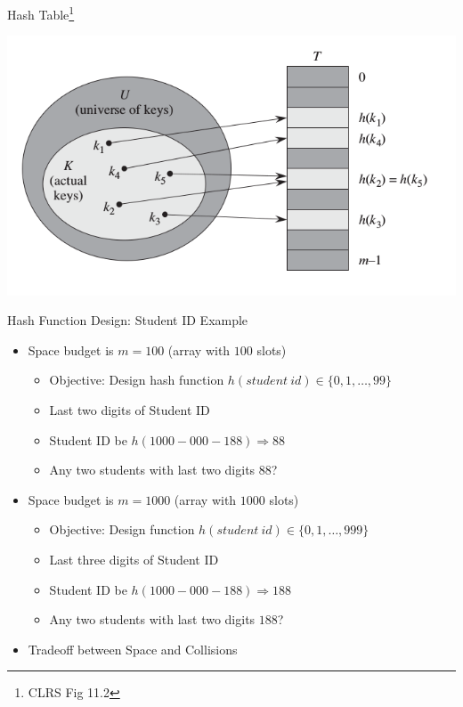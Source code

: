 \documentclass{beamer}
\begin{document}
\begin{frame}{Hash Table\footnote{CLRS Fig 11.2}}
    \begin{center}
        \includegraphics[scale=0.5]{hashTableAbstract.png}
    \end{center}
\end{frame}

\begin{frame}{Hash Function Design: Student ID Example}
    \begin{itemize}
        \item Space budget is $m=100$ (array with $100$ slots) 
        \begin{itemize}
            \item Objective: Design hash function $h(student\ id) \in \{0, 1, \ldots, 99\}$ \pause
            \item Last two digits of Student ID
            \item Student ID be $h(1000-000-188) \Rightarrow 88$ 
            \item Any two students with last two digits $88$?
        \end{itemize} 
        \item Space budget is $m=1000$ (array with $1000$ slots) \pause
        \begin{itemize}
            \item Objective: Design function $h(student\ id) \in \{0, 1, \ldots, 999\}$ \pause
            \item Last three digits of Student ID
            \item Student ID be $h(1000-000-188) \Rightarrow 188$ 
            \item Any two students with last two digits $188$?
        \end{itemize} 
        \item Tradeoff between Space and Collisions
    \end{itemize}
\end{frame}
\end{document}
